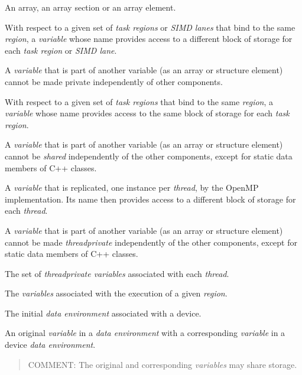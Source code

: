 \glossarydefstart
An array, an array section or an array element.
\glossarydefend

\glossarydefstart
With respect to a given set of \emph{task regions} or \emph{SIMD lanes} that bind to the same
 \emph{region}, a \emph{variable} whose name provides access to a different block of 
storage for each \emph{task region} or \emph{SIMD lane}.

A \emph{variable} that is part of another variable (as an array or structure element) cannot 
be made private independently of other components.
\glossarydefend

\glossarydefstart
With respect to a given set of \emph{task regions} that bind to the same  
\emph{region}, a \emph{variable} whose name provides access to the same block of storage for 
each \emph{task region}.

A \emph{variable} that is part of another variable (as an array or structure element) cannot 
be \emph{shared} independently of the other components, except for static data members 
of C++ classes.
\glossarydefend

\glossarydefstart
A \emph{variable} that is replicated, one instance per \emph{thread}, by the OpenMP 
implementation. Its name then provides access to a different block of storage for 
each \emph{thread}.

A \emph{variable} that is part of another variable (as an array or structure element) cannot 
be made \emph{threadprivate} independently of the other components, except for static 
data members of C++ classes. 
\glossarydefend

\glossarydefstart
The set of \emph{threadprivate variables} associated with each \emph{thread}.
\glossarydefend

\glossarydefstart
The \emph{variables} associated with the execution of a given \emph{region}. 
\glossarydefend

\glossarydefstart
The initial \emph{data environment} associated with a device.
\glossarydefend
\bigskip

\glossarydefstart
An original \emph{variable} in a \emph{data environment} with a corresponding \emph{variable} in a 
device \emph{data environment}.

\begin{quote}
COMMENT: The original and corresponding \emph{variables} may share storage.
\end{quote}
\glossarydefend

